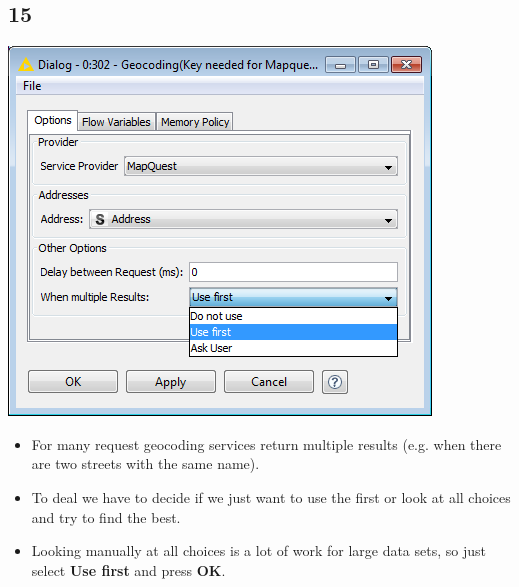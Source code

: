 \documentclass{beamer}
\begin{document}
\subsection{15}
\begin{frame}
	\begin{center}
  		\includegraphics[height=0.5\textheight]{15.png}
	\end{center}
	\begin{itemize}
		\item For many request geocoding services return multiple results (e.g. when there are two streets with the same name).
		\item To deal we have to decide if we just want to use the first or look at all choices and try to find the best.
		\item Looking manually at all choices is a lot of work for large data sets, so just select \textbf{Use first} and press \textbf{OK}.
	\end{itemize}
\end{frame}
\end{document}
